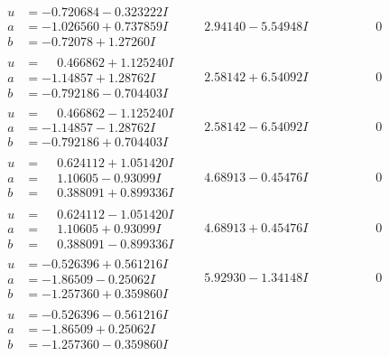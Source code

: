 \documentclass[1p]{elsarticle_modified}
\theoremstyle{definition}
\begin{document}
$$\begin{array}{c|c|c}
\begin{aligned}
u &= -0.720684 - 0.323222 I \\
a &= -1.026560 + 0.737859 I \\
b &= -0.72078 + 1.27260 I\end{aligned}
 & \phantom{-}2.94140 - 5.54948 I & \phantom{-0.000000 } 0 \\ \hline\begin{aligned}
u &= \phantom{-}0.466862 + 1.125240 I \\
a &= -1.14857 + 1.28762 I \\
b &= -0.792186 - 0.704403 I\end{aligned}
 & \phantom{-}2.58142 + 6.54092 I & \phantom{-0.000000 } 0 \\ \hline\begin{aligned}
u &= \phantom{-}0.466862 - 1.125240 I \\
a &= -1.14857 - 1.28762 I \\
b &= -0.792186 + 0.704403 I\end{aligned}
 & \phantom{-}2.58142 - 6.54092 I & \phantom{-0.000000 } 0 \\ \hline\begin{aligned}
u &= \phantom{-}0.624112 + 1.051420 I \\
a &= \phantom{-}1.10605 - 0.93099 I \\
b &= \phantom{-}0.388091 + 0.899336 I\end{aligned}
 & \phantom{-}4.68913 - 0.45476 I & \phantom{-0.000000 } 0 \\ \hline\begin{aligned}
u &= \phantom{-}0.624112 - 1.051420 I \\
a &= \phantom{-}1.10605 + 0.93099 I \\
b &= \phantom{-}0.388091 - 0.899336 I\end{aligned}
 & \phantom{-}4.68913 + 0.45476 I & \phantom{-0.000000 } 0 \\ \hline\begin{aligned}
u &= -0.526396 + 0.561216 I \\
a &= -1.86509 - 0.25062 I \\
b &= -1.257360 + 0.359860 I\end{aligned}
 & \phantom{-}5.92930 - 1.34148 I & \phantom{-0.000000 } 0 \\ \hline\begin{aligned}
u &= -0.526396 - 0.561216 I \\
a &= -1.86509 + 0.25062 I \\
b &= -1.257360 - 0.359860 I\end{aligned}

\end{array}$$
\end{document}
